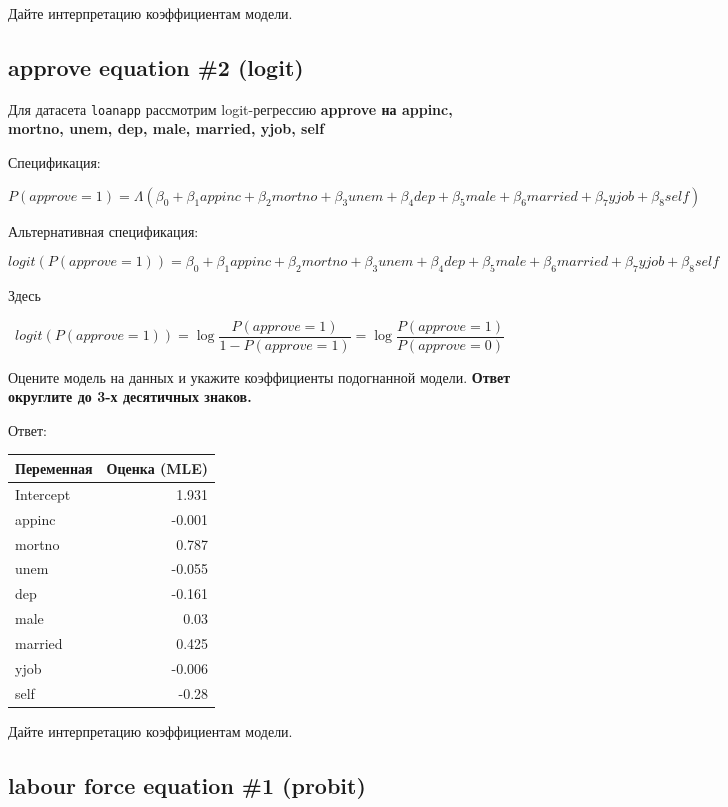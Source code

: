 \documentclass[
  russian,
]{article}
\newcounter{none} %
\begin{document}
Дайте интерпретацию коэффициентам модели.

\subsection{approve equation \#2
(logit)}\label{approve-equation-2-logit}

Для датасета \texttt{loanapp} рассмотрим logit-регрессию \textbf{approve
на appinc, mortno, unem, dep, male, married, yjob, self}

Спецификация:

\[
P(approve=1)=\Lambda(\beta_0+\beta_1appinc+\beta_2mortno+\beta_3unem+\beta_4dep+\beta_5male+\beta_6married+\beta_7yjob+\beta_8self)
\]

Альтернативная спецификация:

\[
logit(P(approve=1))=\beta_0+\beta_1appinc+\beta_2mortno+\beta_3unem+\beta_4dep+\beta_5male+\beta_6married+\beta_7yjob+\beta_8self
\]

Здесь

\[
logit(P(approve=1)) = \log\frac{P(approve=1)}{1-P(approve=1)} = \log\frac{P(approve=1)}{P(approve=0)}
\]

Оцените модель на данных и укажите коэффициенты подогнанной модели.
\textbf{Ответ округлите до 3-х десятичных знаков.}

Ответ:

{\def\LTcaptype{none} %
\begin{longtable}[]{@{}lr@{}}
\toprule\noalign{}
Переменная & Оценка (MLE) \\
\midrule\noalign{}
\endhead
\bottomrule\noalign{}
\endlastfoot
Intercept & 1.931 \\
appinc & -0.001 \\
mortno & 0.787 \\
unem & -0.055 \\
dep & -0.161 \\
male & 0.03 \\
married & 0.425 \\
yjob & -0.006 \\
self & -0.28 \\
\end{longtable}
}

Дайте интерпретацию коэффициентам модели.

\subsection{labour force equation \#1
(probit)}\label{labour-force-equation-1-probit}
\end{document}
